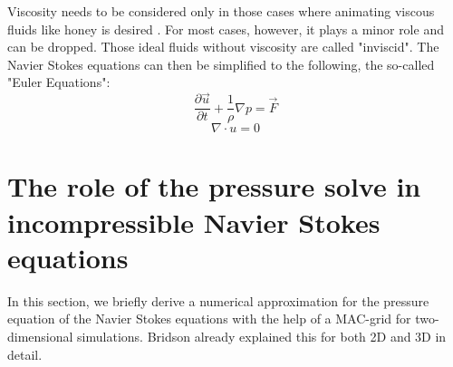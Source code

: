 \par Viscosity needs to be considered only in those cases where animating viscous fluids like honey is desired \parencite{bridson2015fluid}. For most cases, however, it plays a minor role and can be dropped. Those ideal fluids without viscosity are called "inviscid". The Navier Stokes equations can then be simplified to the following, the so-called "Euler Equations":
\begin{equation} \label{euler-equation1}
    \frac{\partial \vec{u}}{\partial t} + \frac{1}{\rho}  \nabla p = \vec{F}
\end{equation}
\begin{equation} \label{euler-equation2}
    \nabla \cdot u = 0
\end{equation}

\section{The role of the pressure solve in incompressible Navier Stokes equations}
In this section, we briefly derive a numerical approximation for the pressure equation of the Navier Stokes equations with the help of a MAC-grid for two-dimensional simulations. Bridson \parencite{bridson2015fluid} \parencite{bridson2007fluid} already explained this for both 2D and 3D in detail.
